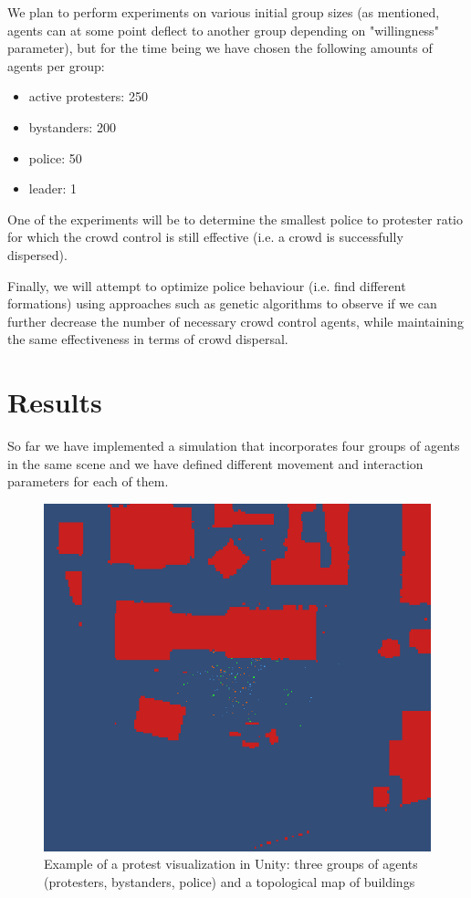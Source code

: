 \documentclass[9pt]{pnas-new}
\begin{document}
\bigskip
We plan to perform experiments on various initial group sizes (as mentioned, agents can at some point deflect to another group depending on "willingness" parameter), but for the time being we have chosen the following amounts of agents per group:
\begin{itemize}
    \item active protesters: 250
    \item bystanders: 200
    \item police: 50
    \item leader: 1
\end{itemize}

One of the experiments will be to determine the smallest police to protester ratio for which the crowd control is still effective (i.e. a crowd is successfully dispersed). 

\bigskip
Finally, we will attempt to optimize police behaviour (i.e. find different formations) using approaches such as genetic algorithms to observe if we can further decrease the number of necessary crowd control agents, while maintaining the same effectiveness in terms of crowd dispersal. 

\section*{Results}

So far we have implemented a simulation that incorporates four groups of agents in the same scene and we have defined different movement and interaction parameters for each of them. 

\begin{figure}[H]
\begin{center}
\includegraphics[width=0.8\columnwidth]{simulation.png}
\end{center}
\caption{Example of a protest visualization in Unity: three groups of agents (protesters, bystanders, police) and a topological map of buildings}
\label{fig1}
\end{figure}
\end{document}

